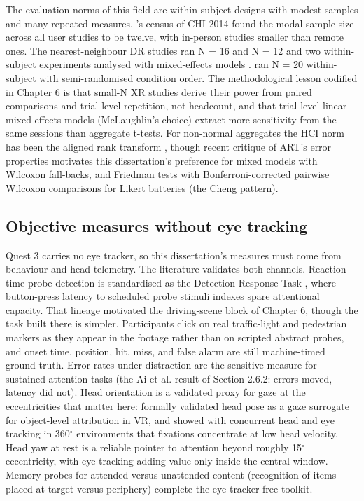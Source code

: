 The evaluation norms of this field are within-subject designs with modest samples and many repeated
measures. \citet{caine2016}'s census of CHI 2014 found the modal sample size across all user studies to
be twelve, with in-person studies smaller than remote ones. The nearest-neighbour DR studies ran
N = 16 and N = 12 \citep{cheng2022} and two within-subject experiments analysed with
mixed-effects models \citep{mclaughlin2025}. \citet{sutton2022} ran N = 20 within-subject with
semi-randomised condition order. The methodological lesson codified in Chapter 6 is that small-N XR
studies derive their power from paired comparisons and trial-level repetition, not headcount, and
that trial-level linear mixed-effects models (McLaughlin's choice) extract more sensitivity from the
same sessions than aggregate t-tests. For non-normal aggregates the HCI norm has been the aligned
rank transform \citep{wobbrock2011}, though recent critique of ART's error properties \citep{tsandilas2024} motivates this dissertation's preference for mixed models with
Wilcoxon fall-backs, and Friedman tests with Bonferroni-corrected pairwise Wilcoxon comparisons for
Likert batteries (the Cheng pattern).

\subsection{Objective measures without eye tracking}

Quest 3 carries no eye tracker, so this dissertation's measures must come from behaviour and head
telemetry. The literature validates both channels. Reaction-time probe detection is standardised as
the Detection Response Task \citep{iso2016}, where button-press latency to scheduled probe stimuli
indexes spare attentional capacity. That lineage motivated the driving-scene block of Chapter 6,
though the task built there is simpler. Participants click on real traffic-light and pedestrian
markers as they appear in the footage rather than on scripted abstract probes, and onset time,
position, hit, miss, and false alarm are still machine-timed ground truth. Error rates under
distraction are the sensitive measure
for sustained-attention tasks (the Ai et al. result of Section 2.6.2: errors moved, latency did
not). Head orientation is a validated proxy for gaze at the eccentricities that matter here: \citet{higgins2022} formally validated head pose as a gaze surrogate for object-level attribution in VR,
and \citet{sitzmann2018} showed with concurrent head and eye tracking in 360$^{\circ}$ environments that
fixations concentrate at low head velocity. Head yaw at rest is a reliable pointer to attention
beyond roughly 15$^{\circ}$ eccentricity, with eye tracking adding value only inside the central window.
Memory probes for attended versus unattended content (recognition of items placed at target versus
periphery) complete the eye-tracker-free toolkit.

